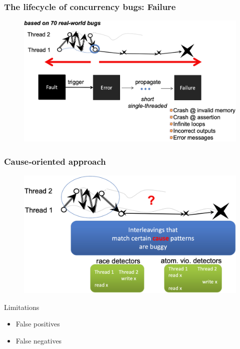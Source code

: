 % 
\begin{frame}[fragile]
    \frametitle{The lifecycle of concurrency bugs: Failure}
    \begin{figure}
    \includegraphics[width=0.75\linewidth]{figs/failure.png}
    \end{figure}
\end{frame}
% 
% 
\begin{frame}[fragile]
    \frametitle{Cause‐oriented approach}
    \begin{figure}
    \includegraphics[width=0.55\linewidth]{figs/cause-oriented-approach.png}
    \end{figure} \pause
	\begin{block}{Limitations}

        \begin{itemize}
            \item False positives
            \item False negatives
        \end{itemize}
    \end{block}
\end{frame}
